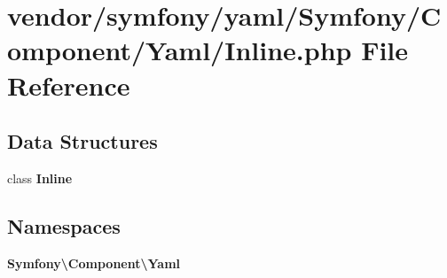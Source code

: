 \section{vendor/symfony/yaml/\+Symfony/\+Component/\+Yaml/\+Inline.php File Reference}
\label{symfony_2yaml_2_symfony_2_component_2_yaml_2_inline_8php}
\subsection*{Data Structures}
\begin{DoxyCompactItemize}
\item 
class {\bf Inline}
\end{DoxyCompactItemize}
\subsection*{Namespaces}
\begin{DoxyCompactItemize}
\item 
 {\bf Symfony\textbackslash{}\+Component\textbackslash{}\+Yaml}
\end{DoxyCompactItemize}
